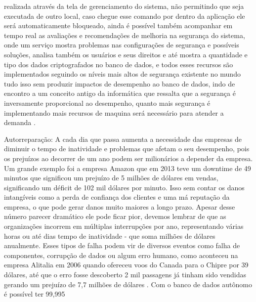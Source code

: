realizada através da tela de gerenciamento do sistema, não permitindo que seja executada de outro local, caso chegue esse comando por dentro da aplicação ele será automaticamente bloqueado, ainda é possível também acompanhar em tempo real as avaliações e recomendações de melhoria na segurança do sistema, onde um serviço mostra problemas nas configurações de segurança e possíveis soluções, analisa também os usuários e seus direitos e até mostra a quantidade e tipo dos dados criptografados no banco de dados, e   todos esses recursos são implementados seguindo os níveis mais altos de segurança existente no mundo tudo isso sem produzir impactos de desempenho ao banco de dados, indo de encontro a um conceito antigo da informática que ressalta que a segurança é inversamente proporcional ao desempenho, quanto mais segurança é implementando mais recursos de maquina será necessário para atender a demanda \cite{OracleDefesa}.
	
	
Autorreparação: A cada dia que passa aumenta a necessidade das empresas de diminuir o tempo de inatividade e problemas que afetam o seu desempenho, pois os prejuízos ao decorrer de um ano podem ser milionários a depender da empresa. Um grande exemplo foi a empresa Amazon que em 2013 teve um downtime de 49 minutos que significou um prejuízo de 5 milhões de dólares em vendas, significando um déficit de 102 mil dólares por minuto. Isso sem contar os danos intangíveis como a perda de confiança dos clientes e uma má reputação da empresa, o que pode gerar danos muito maiores a longo prazo. Apesar desse número parecer dramático ele pode ficar pior, devemos lembrar de que as organizações incorrem em múltiplas interrupções por ano, representando várias horas ou até dias tempo de inatividade - que soma milhões de dólares anualmente. Esses tipos de falha podem vir de diversos eventos como falha de componentes, corrupção de dados ou algum erro humano, como aconteceu na empresa Alitalia em 2006 quando ofereceu voos do Canada para o Chipre por 39 dólares, até que o erro fosse descoberto 2 mil passagens já tinham sido vendidas gerando um prejuízo de 7,7 milhões de dólares \cite{Trapalhada}. Com o banco de dados autônomo é possível ter 99,995%


